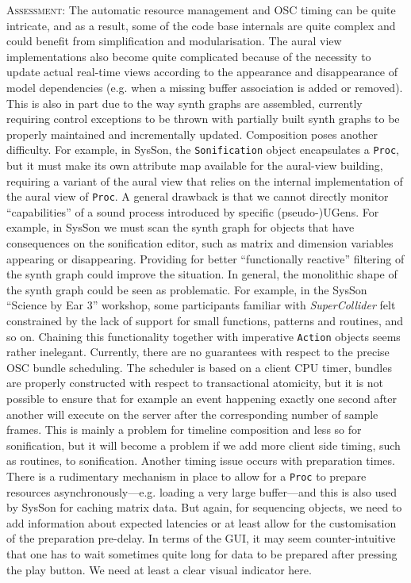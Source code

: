 \documentclass[11pt,a4paper]{article}
\newcommand{\software}[1]{\textit{#1}}
\newcommand{\sysson}[0]{SysSon}
\newcommand{\assessment}[0]{\textsc{Assessment:}}
\begin{document}
\assessment{} The automatic resource management and OSC timing can be quite intricate, and as a result, some of the code base internals are quite complex and could benefit from simplification and modularisation. The aural view implementations also become quite complicated because of the necessity to update actual real-time views according to the appearance and disappearance of model dependencies (e.g. when a missing buffer association is added or removed). This is also in part due to the way synth graphs are assembled, currently requiring control exceptions to be thrown with partially built synth graphs to be properly maintained and incrementally updated. Composition poses another difficulty. For example, in \sysson{}, the \verb!Sonification! object encapsulates a \verb!Proc!, but it must make its own attribute map available for the aural-view building, requiring a variant of the aural view that relies on the internal implementation of the aural view of \verb!Proc!. A general drawback is that we cannot directly monitor ``capabilities'' of a sound process introduced by specific (pseudo-)UGens. For example, in \sysson{} we must scan the synth graph for objects that have consequences on the sonification editor, such as matrix and dimension variables appearing or disappearing. Providing for better ``functionally reactive'' filtering of the synth graph could improve the situation. In general, the monolithic shape of the synth graph could be seen as problematic. For example, in the \sysson{} ``Science by Ear 3'' workshop, some participants familiar with \software{SuperCollider} felt constrained by the lack of support for small functions, patterns and routines, and so on. Chaining this functionality together with imperative \verb!Action! objects seems rather inelegant. %
Currently, there are no guarantees with respect to the precise OSC bundle scheduling. The scheduler is based on a client CPU timer, bundles are properly constructed with respect to transactional atomicity, but it is not possible to ensure that for example an event happening exactly one second after another will execute on the server after the corresponding number of sample frames. This is mainly a problem for timeline composition and less so for sonification, but it will become a problem if we add more client side timing, such as routines, to sonification. Another timing issue occurs with preparation times. There is a rudimentary mechanism in place to allow for a \verb!Proc! to prepare resources asynchronously---e.g. loading a very large buffer---and this is also used by \sysson{} for caching matrix data. But again, for sequencing objects, we need to add information about expected latencies or at least allow for the customisation of the preparation pre-delay. In terms of the GUI, it may seem counter-intuitive that one has to wait sometimes quite long for data to be prepared after pressing the play button. We need at least a clear visual indicator here.
\end{document}

